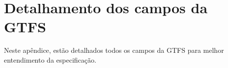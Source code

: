 \documentclass[
	12pt,				%
	oneside,			%
	a4paper,			%
	english,			%
	brazil				%
	]{abntex2ppgsi}
\begin{document}
{{\begin{apendicesenv}
\begin{longtable}{c|c}
\end{longtable}
\vspace{-\baselineskip}

\clearpage


%
%
%
\chapter{Detalhamento dos campos da GTFS}
\label{apendiceC}

Neste apêndice, estão detalhados todos os campos da GTFS para melhor entendimento da especificação.



\end{apendicesenv}}}
\end{document}
